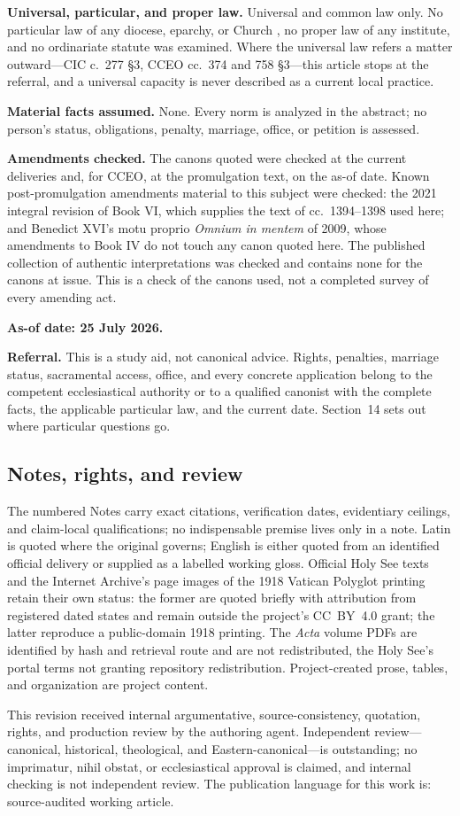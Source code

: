 \textbf{Universal, particular, and proper law.} Universal and common law only. No particular law of any diocese, eparchy, or Church , no proper law of any institute, and no ordinariate statute was examined. Where the universal law refers a matter outward---CIC c.~277 §3, CCEO cc.~374 and 758 §3---this article stops at the referral, and a universal capacity is never described as a current local practice.

\textbf{Material facts assumed.} None. Every norm is analyzed in the abstract; no person's status, obligations, penalty, marriage, office, or petition is assessed.

\textbf{Amendments checked.} The canons quoted were checked at the current deliveries and, for CCEO, at the promulgation text, on the as-of date. Known post-promulgation amendments material to this subject were checked: the 2021 integral revision of Book VI, which supplies the text of cc.~1394--1398 used here; and Benedict XVI's motu proprio \emph{Omnium in mentem} of 2009, whose amendments to Book IV do not touch any canon quoted here. The published collection of authentic interpretations was checked and contains none for the canons at issue. This is a check of the canons used, not a completed survey of every amending act.

\textbf{As-of date: 25 July 2026.}

\textbf{Referral.} This is a study aid, not canonical advice. Rights, penalties, marriage status, sacramental access, office, and every concrete application belong to the competent ecclesiastical authority or to a qualified canonist with the complete facts, the applicable particular law, and the current date. Section~14 sets out where particular questions go.

\subsection{Notes, rights, and review}

The numbered Notes carry exact citations, verification dates, evidentiary ceilings, and claim-local qualifications; no indispensable premise lives only in a note. Latin is quoted where the original governs; English is either quoted from an identified official delivery or supplied as a labelled working gloss. Official Holy See texts and the Internet Archive's page images of the 1918 Vatican Polyglot printing retain their own status: the former are quoted briefly with attribution from registered dated states and remain outside the project's CC~BY~4.0 grant; the latter reproduce a public-domain 1918 printing. The \emph{Acta} volume PDFs are identified by hash and retrieval route and are not redistributed, the Holy See's portal terms not granting repository redistribution. Project-created prose, tables, and organization are project content.

This revision received internal argumentative, source-consistency, quotation, rights, and production review by the authoring agent. Independent review---canonical, historical, theological, and Eastern-canonical---is outstanding; no imprimatur, nihil obstat, or ecclesiastical approval is claimed, and internal checking is not independent review. The publication language for this work is: source-audited working article.
